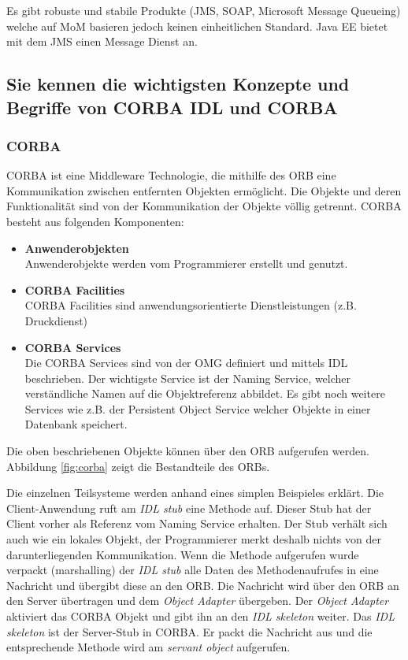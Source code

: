 Es gibt robuste und stabile Produkte (\ac{JMS}, SOAP, Microsoft Message Queueing) welche auf \ac{MoM} basieren jedoch keinen einheitlichen Standard. Java EE bietet mit dem \ac{JMS} einen Message Dienst an.

\subsection{Sie kennen die wichtigsten Konzepte und Begriffe von CORBA IDL und CORBA}

\subsubsection{CORBA}

CORBA ist eine Middleware Technologie, die mithilfe des \ac{ORB} eine Kommunikation zwischen entfernten Objekten ermöglicht. Die Objekte und deren Funktionalität sind von der Kommunikation der Objekte völlig getrennt. CORBA besteht aus folgenden Komponenten:

\begin{itemize}
	\item \textbf{Anwenderobjekten} \\
		  Anwenderobjekte werden vom Programmierer erstellt und genutzt.
	\item \textbf{CORBA Facilities} \\
		  CORBA Facilities sind anwendungsorientierte Dienstleistungen (z.B. Druckdienst)
	\item \textbf{CORBA Services} \\
		  Die CORBA Services sind von der \ac{OMG} definiert und mittels IDL beschrieben. Der wichtigste Service ist der Naming Service, welcher verständliche Namen auf die Objektreferenz abbildet. Es gibt noch weitere Services wie z.B. der Persistent Object Service welcher Objekte in einer Datenbank speichert.
\end{itemize}

Die oben beschriebenen Objekte können über den \ac{ORB} aufgerufen werden. Abbildung \ref{fig:corba} zeigt die Bestandteile des \acp{ORB}.


Die einzelnen Teilsysteme werden anhand eines simplen Beispieles erklärt. Die Client-Anwendung ruft am \emph{IDL stub} eine Methode auf. Dieser Stub hat der Client vorher als Referenz vom Naming Service erhalten. Der Stub verhält sich auch wie ein lokales Objekt, der Programmierer merkt deshalb nichts von der darunterliegenden Kommunikation. Wenn die Methode aufgerufen wurde verpackt (marshalling) der \emph{IDL stub} alle Daten des Methodenaufrufes in eine Nachricht und übergibt diese an den \ac{ORB}. Die Nachricht wird über den \ac{ORB} an den Server übertragen und dem \emph{Object Adapter} übergeben. Der \emph{Object Adapter} aktiviert das CORBA Objekt und gibt ihn an den \emph{IDL skeleton} weiter. Das \emph{IDL skeleton} ist der Server-Stub in CORBA. Er packt die Nachricht aus und die entsprechende Methode wird am \emph{servant object} aufgerufen.

